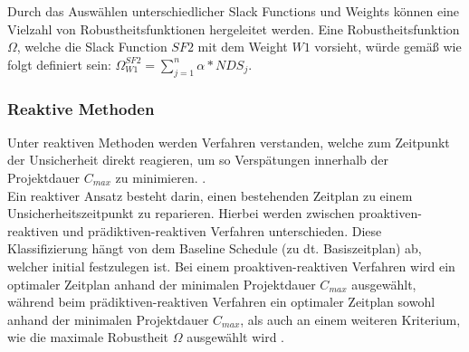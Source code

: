 \begin{table}[H]
\centering
{}%

\caption{Definitionen von Weights für die Gewichtung der Slacks innerhalb der Slack Functions zur Robustsheitmessung}
\label{tab:Weights}
\end{table}

Durch das Auswählen unterschiedlicher Slack Functions und Weights können eine Vielzahl von Robustheitsfunktionen hergeleitet werden. Eine Robustheitsfunktion $\Omega$, welche die Slack Function $SF2$ mit dem Weight $W1$ vorsieht, würde gemäß \cite{khemakhem_efficient_2013} wie folgt definiert sein: $\Omega^{SF2}_{W1} = \sum_{j=1}^n \alpha * NDS_j$. 

\subsubsection{Reaktive Methoden} \label{subsec:Reaktive_Methoden}

Unter reaktiven Methoden werden Verfahren verstanden, welche zum Zeitpunkt der Unsicherheit direkt reagieren, um so Verspätungen innerhalb der Projektdauer $C_{max}$ zu minimieren. \cite[vgl.][S. 404 f.]{brcic_resource_2012}. \\

Ein reaktiver Ansatz besteht darin, einen bestehenden Zeitplan zu einem Unsicherheitszeitpunkt zu reparieren. Hierbei werden zwischen proaktiven-reaktiven und prädiktiven-reaktiven Verfahren unterschieden. Diese Klassifizierung hängt von dem Baseline Schedule (zu dt. Basiszeitplan) ab, welcher initial festzulegen ist. Bei einem proaktiven-reaktiven Verfahren wird ein optimaler Zeitplan anhand der minimalen Projektdauer $C_{max}$ ausgewählt, während beim prädiktiven-reaktiven Verfahren ein optimaler Zeitplan sowohl anhand der minimalen Projektdauer $C_{max}$, als auch an einem weiteren Kriterium, wie die maximale Robustheit $\Omega$ ausgewählt wird \cite[vgl.][S. 404 f.]{brcic_resource_2012}. \\

